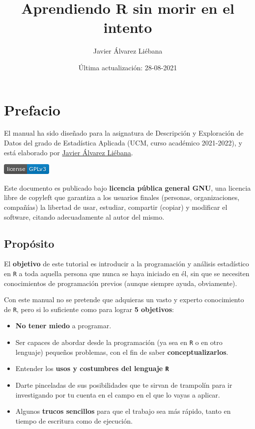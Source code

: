 \documentclass[11pt,]{book}
\title{Aprendiendo R sin morir en el intento}
\author{Javier Álvarez Liébana}
\date{Última actualización: 28-08-2021}
\providecommand{\tightlist}{%
  \setlength{\itemsep}{0pt}\setlength{\parskip}{0pt}}
\begin{document}
\maketitle

{
\hypersetup{linkcolor=}
\setcounter{tocdepth}{2}
\tableofcontents
}
\listoftables
\listoffigures
\hypertarget{prefacio}{%
\chapter*{Prefacio}\label{prefacio}}


El manual ha sido diseñado para la asignatura de Descripción y Exploración de Datos del grado de Estadística Aplicada (UCM, curso académico 2021-2022), y está elaborado por \href{twitter.com/dadosdelaplace}{Javier Álvarez Liébana}.

\href{https://www.gnu.org/licenses/gpl-3.0}{\includegraphics{img/license-GPLv3-blue.png}}

Este documento es publicado bajo \textbf{licencia pública general GNU}, una licencia libre de copyleft que garantiza a los usuarios finales (personas, organizaciones, compañías) la libertad de usar, estudiar, compartir (copiar) y modificar el software, citando adecuadamente al autor del mismo.

\hypertarget{propuxf3sito}{%
\section*{Propósito}\label{propuxf3sito}}


El \textbf{objetivo} de este tutorial es introducir a la programación y análisis estadístico en \texttt{R} a toda aquella persona que nunca se haya iniciado en él, sin que se necesiten conocimientos de programación previos (aunque siempre ayuda, obviamente).

Con este manual no se pretende que adquieras un vasto y experto conocimiento de \texttt{R}, pero si lo suficiente como para lograr \textbf{5 objetivos}:

\begin{itemize}
\tightlist
\item
  \textbf{No tener miedo} a programar.
\item
  Ser capaces de abordar desde la programación (ya sea en \texttt{R} o en otro lenguaje) pequeños problemas, con el fin de saber \textbf{conceptualizarlos}.
\item
  Entender los \textbf{usos y costumbres del lenguaje \texttt{R}}
\item
  Darte pinceladas de sus posibilidades que te sirvan de trampolín para ir investigando por tu cuenta en el campo en el que lo vayas a aplicar.
\item
  Algunos \textbf{trucos sencillos} para que el trabajo sea más rápido, tanto en tiempo de escritura como de ejecución.
\end{itemize}
\end{document}
